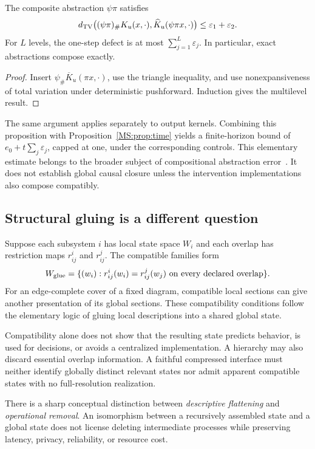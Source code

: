 \begin{MSproposition}\label{MS:prop:composition}
The composite abstraction $\psi\pi$ satisfies
\[
d_{\mathrm{TV}}\bigl((\psi\pi)_{\#}K_u(x,\cdot),
\widehat K_u(\psi\pi x,\cdot)\bigr)
\leq\varepsilon_1+\varepsilon_2.
\]
For $L$ levels, the one-step defect is at most $\sum_{j=1}^L\varepsilon_j$. In particular, exact abstractions compose exactly.
\end{MSproposition}
\begin{proof}
Insert $\psi_{\#}\overline K_u(\pi x,\cdot)$, use the triangle inequality, and use nonexpansiveness of total variation under deterministic pushforward. Induction gives the multilevel result.
\end{proof}

The same argument applies separately to output kernels. Combining this proposition with Proposition~\ref{MS:prop:time} yields a finite-horizon bound of $e_0+t\sum_j\varepsilon_j$, capped at one, under the corresponding controls. This elementary estimate belongs to the broader subject of compositional abstraction error~\cite{MS:rischel}. It does not establish global causal closure unless the intervention implementations also compose compatibly.

\subsection{Structural gluing is a different question}
Suppose each subsystem $i$ has local state space $W_i$ and each overlap has restriction maps $r_{ij}^i$ and $r_{ij}^j$. The compatible families form
\[
W_{\rm glue}=\{(w_i):r_{ij}^i(w_i)=r_{ij}^j(w_j)\text{ on every declared overlap}\}.
\]
For an edge-complete cover of a fixed diagram, compatible local sections can give another presentation of its global sections. These compatibility conditions follow the elementary logic of gluing local descriptions into a shared global state.

Compatibility alone does not show that the resulting state predicts behavior, is used for decisions, or avoids a centralized implementation. A hierarchy may also discard essential overlap information. A faithful compressed interface must neither identify globally distinct relevant states nor admit apparent compatible states with no full-resolution realization.

There is a sharp conceptual distinction between \emph{descriptive flattening} and \emph{operational removal}. An isomorphism between a recursively assembled state and a global state does not license deleting intermediate processes while preserving latency, privacy, reliability, or resource cost.

